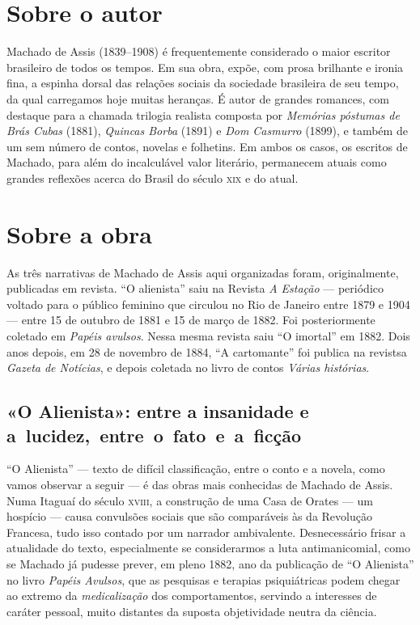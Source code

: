 
\section{Sobre o autor}

Machado de Assis (1839--1908) é frequentemente considerado o maior escritor brasileiro de todos os tempos. Em sua obra, expõe, com prosa brilhante e ironia fina, a espinha dorsal das relações sociais da sociedade brasileira de seu tempo, da qual carregamos hoje muitas heranças. É autor de grandes romances, com destaque para a chamada trilogia realista composta por \emph{Memórias póstumas de Brás Cubas} (1881), \emph{Quincas Borba} (1891) e \emph{Dom Casmurro} (1899), e também de um sem número de contos, novelas e folhetins. Em ambos os casos, os escritos de Machado, para além do incalculável valor literário, permanecem atuais como grandes reflexões acerca do Brasil do século \textsc{xix} e do atual.

\section{Sobre a obra}

As três narrativas de Machado de Assis aqui organizadas foram, originalmente,
publicadas em revista. ``O alienista'' saiu na Revista \emph{A Estação} --- periódico voltado para o público feminino que circulou no Rio de Janeiro entre 1879 e 1904 --- entre 15 de outubro de 1881 e 15 de março de 1882. Foi posteriormente coletado em \textit{Papéis avulsos}.
Nessa mesma revista saiu ``O imortal'' em 1882.
Dois anos depois, em 28 de novembro de 1884, ``A cartomante'' foi publica na revistsa \emph{Gazeta de Notícias}, e depois coletada no livro de contos \emph{Várias histórias}.

\subsection{«O Alienista»: entre a insanidade e a~lucidez,~entre~o~fato~e~a~ficção}

``O Alienista'' --- texto de difícil classificação, entre o conto e a
novela, como vamos observar a seguir --- é das obras mais conhecidas de
Machado de Assis. Numa Itaguaí do século \textsc{xviii}, a construção de uma Casa
de Orates --- um hospício --- causa convulsões sociais que são comparáveis
às da Revolução Francesa, tudo isso contado por um narrador ambivalente.
Desnecessário frisar a atualidade do texto, especialmente se
considerarmos a luta antimanicomial, como se Machado já pudesse prever,
em pleno 1882, ano da publicação de ``O Alienista'' no livro
\emph{Papéis Avulsos}, que as pesquisas e terapias psiquiátricas podem
chegar ao extremo da \emph{medicalização} dos comportamentos, servindo a
interesses de caráter pessoal, muito distantes da suposta objetividade
neutra da ciência.

